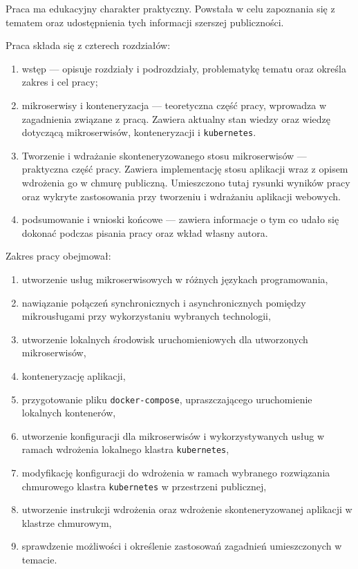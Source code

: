 \documentclass[12pt,twoside]{article}
\begin{document}
Praca ma edukacyjny charakter praktyczny. Powstała w celu zapoznania się z tematem oraz udostępnienia tych informacji szerszej publiczności.

Praca składa się z czterech rozdziałów:
\begin{enumerate}[label=\arabic*), leftmargin=1.25cm]
\item wstęp — opisuje rozdziały i podrozdziały, problematykę tematu oraz określa zakres i cel pracy;
\item mikroserwisy i konteneryzacja — teoretyczna część pracy, wprowadza w zagadnienia związane z pracą. Zawiera aktualny stan wiedzy oraz wiedzę dotyczącą mikroserwisów, konteneryzacji i \texttt{kubernetes}.
\item Tworzenie i wdrażanie skonteneryzowanego stosu mikroserwisów — praktyczna część pracy. Zawiera implementację stosu aplikacji wraz z opisem wdrożenia go w chmurę publiczną. Umieszczono tutaj rysunki wyników pracy oraz wykryte zastosowania przy tworzeniu i wdrażaniu aplikacji webowych.
\item podsumowanie i wnioski końcowe — zawiera informacje o tym co udało się dokonać podczas pisania pracy oraz wkład własny autora.
\end{enumerate}
\clearpage

Zakres pracy obejmował:
\begin{enumerate}[label=\arabic*), leftmargin=1.25cm]
\item utworzenie usług mikroserwisowych w różnych językach programowania,
\item nawiązanie połączeń synchronicznych i asynchronicznych pomiędzy mikrousługami przy wykorzystaniu wybranych technologii,
\item utworzenie lokalnych środowisk uruchomieniowych dla utworzonych mikroserwisów,
\item konteneryzację aplikacji,
\item przygotowanie pliku \texttt{docker-compose}, upraszczającego uruchomienie lokalnych kontenerów,
\item utworzenie konfiguracji dla mikroserwisów i wykorzystywanych usług w ramach wdrożenia lokalnego klastra \texttt{kubernetes},
\item modyfikację konfiguracji do wdrożenia w ramach wybranego rozwiązania chmurowego klastra \texttt{kubernetes} w przestrzeni publicznej,
\item utworzenie instrukcji wdrożenia oraz wdrożenie skonteneryzowanej aplikacji w klastrze chmurowym,
\item sprawdzenie możliwości i określenie zastosowań zagadnień umieszczonych w temacie.
\end{enumerate}
\end{document}
